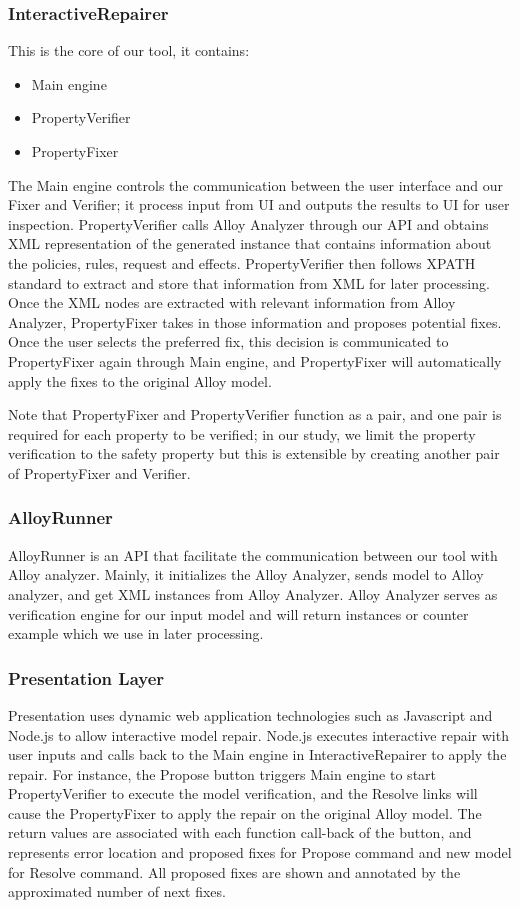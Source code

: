 \documentclass{acm_proc_article-sp}
\begin{document}
\subsubsection{InteractiveRepairer}
This is the core of our tool, it contains:
\begin{itemize}
\item Main engine
\item PropertyVerifier
\item PropertyFixer
\end{itemize}
The Main engine controls the communication between the user interface and our Fixer and Verifier; it process input from UI and outputs the results to UI for user inspection. PropertyVerifier calls Alloy Analyzer through our API and obtains XML representation of the generated instance that contains information about the policies, rules, request and effects. PropertyVerifier then follows XPATH standard to extract and store that information from XML for later processing. Once the XML nodes are extracted with relevant information from Alloy Analyzer, PropertyFixer takes in those information and proposes potential fixes. Once the user selects the preferred fix, this decision is communicated to PropertyFixer again through Main engine, and PropertyFixer will automatically apply the fixes to the original Alloy model.

Note that PropertyFixer and PropertyVerifier function as a pair, and one pair is required for each property to be verified; in our study, we limit the property verification to the safety property but this is extensible by creating another pair of PropertyFixer and Verifier.

\subsubsection{AlloyRunner}
AlloyRunner is an API that facilitate the communication between our tool with Alloy analyzer. Mainly, it initializes the Alloy Analyzer, sends model to Alloy analyzer, and get XML instances from Alloy Analyzer. Alloy Analyzer serves as verification engine for our input model and will return instances or counter example which we use in later processing.

\subsubsection{Presentation Layer}
Presentation uses dynamic web application technologies such as Javascript and Node.js to allow interactive model repair. Node.js executes interactive repair with user inputs and calls back to the Main engine in InteractiveRepairer to apply the repair. For instance, the Propose button triggers Main engine to start PropertyVerifier to execute the model verification, and the Resolve links will cause the PropertyFixer to apply the repair on the original Alloy model. The return values are associated with each function call-back of the button, and represents error location and proposed fixes for Propose command and new model for Resolve command. All proposed fixes are shown and annotated by the approximated number of next fixes.
\end{document}
